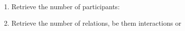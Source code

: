 																																																																																																																																																																																																																																																																																																																																																																																																																																																																				\begin{enumerate}[leftmargin=0cm]
																																																																																																																																																																																																																																																																																																																																																																																																																																																																					\item Retrieve the number of participants:\\
																																																																																																																																																																																																																																																																																																																																																																																																																																																																											\item Retrieve the number of relations, be them interactions or

\end{enumerate}
